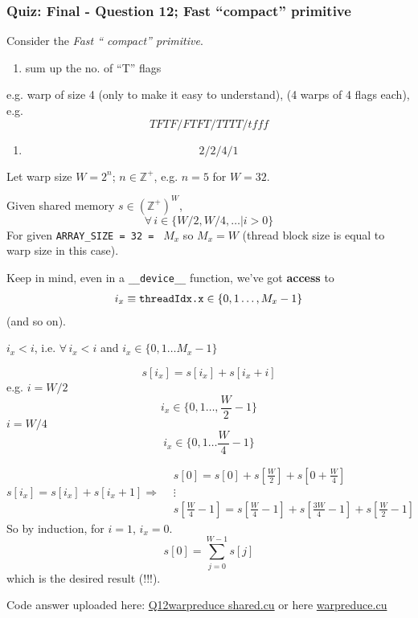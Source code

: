 \documentclass[10pt]{amsart}
\begin{document}
\begin{multicols*}{2}
\subsubsection{Quiz: Final - Question 12; Fast ``compact'' primitive}

Consider the \emph{Fast `` compact'' primitive}.

\begin{enumerate}
\item sum up the no. of ``T'' flags
\end{enumerate}
e.g. warp of size 4 (only to make it easy to understand), (4 warps of 4 flags each), e.g.
\[
TFTF / FTFT / TTTT / tfff
\]

\begin{enumerate}
\item \[
2 / 2 / 4 / 1 
  \]
  \end{enumerate}

Let warp size $W=2^n$; $n\in \mathbb{Z}^+$, e.g. $n=5$ for $W=32$.

Given shared memory $s\in (\mathbb{Z}^+)^W$,
\[
\forall \, i \in \lbrace W/2, W/4 , \dots | i > 0 \rbrace
\]
For given \verb|ARRAY_SIZE = 32 = | $M_x$ so $M_x =W$ (thread block size is equal to warp size in this case).

Keep in mind, even in a \verb|__device__| function, we've got \textbf{access} to
\[
\begin{gathered}
  i_x \equiv \verb|threadIdx.x| \in \lbrace 0 , 1\dots, M_x - 1\rbrace
\end{gathered}
\]
(and so on).

$i_x < i$, i.e. $\forall \, i_x < i$ and $i_x \in \lbrace 0 , 1\dots M_x - 1\rbrace$

\[
s[i_x] = s[i_x] + s[i_x + i]
\]
e.g. $i=W/2$
\[
i_x \in \lbrace 0 ,1 \dots, \frac{W}{2} - 1\rbrace
\]
$i = W/4$
\[
i_x \in \lbrace 0,1 \dots \frac{W}{4} -1 \rbrace
\]

\[
s[i_x] = s[i_x] + s[i_x+1] \Longrightarrow \begin{aligned}
& s[0] = s[0] + s[\frac{W}{2} ] + s[0 + \frac{W}{4} ] \\ 
  & \vdots \\
  & s[\frac{W}{4} -1 ] = s[ \frac{W}{4}-1] + s[\frac{3W}{4} - 1] + s[\frac{W}{2} -1]
  \end{aligned}
\]
So by induction, for $i=1$, $i_x=0$.
\[
s[0] = \sum_{j=0}^{W-1} s[j]
\]
which is the desired result (!!!).

Code answer uploaded here: \href{https://github.com/ernestyalumni/cs344/blob/master/Final/Q12warpreduce_shared.cu}{Q12warpreduce shared.cu} or here \href{https://github.com/ernestyalumni/cs344/blob/master/Final/warpreduce/part_a/warpreduce.cu}{warpreduce.cu}






\end{multicols*}
\end{document}
